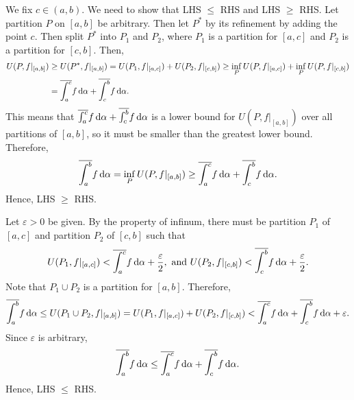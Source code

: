\documentclass[12pt]{article}
\begin{document}
\begin{fproof}[1(a)]
    We fix \(c \in (a,b)\).
    We need to show that LHS \(\leq\) RHS and LHS \(\geq\) RHS.
    Let partition \(P\) on \([a,b]\) be arbitrary.
    Then let \(P^*\) by its refinement by adding the point \(c\).
    Then split \(P^*\) into \(P_1\) and \(P_2\), where \(P_1\) is a partition for \([a,c]\) and \(P_2\) is a partition for \([c,b]\).
    Then,
    \begin{align*}
        U(P, f|_{[a,b]}) &\geq U(P^*, f|_{[a,b]}) = U(P_1, f|_{[a,c]}) + U(P_2, f|_{[c,b]}) \geq \inf_P U(P, f|_{[a,c]}) + \inf_P U(P, f|_{[c,b]})\\
        & = \overline{\int_{a}^{c}} f \mathop{}\!\mathrm{d}\alpha + \overline{\int_{c}^{b}} f\mathop{}\!\mathrm{d}\alpha.
    \end{align*}
    This means that \(\overline{\int_{a}^{c}} f \mathop{}\!\mathrm{d}\alpha + \overline{\int_{c}^{b}} f\mathop{}\!\mathrm{d}\alpha\) is a lower bound for \(U(P, f|_{[a,b]})\) over all partitions of \([a,b]\), so it must be smaller than the greatest lower bound. Therefore,
    \begin{align*}
        \overline{\int_{a}^{b}} f \mathop{}\!\mathrm{d}\alpha = \inf_{P} U(P, f|_{[a,b]}) \geq \overline{\int_{a}^{c}} f \mathop{}\!\mathrm{d}\alpha + \overline{\int_{c}^{b}} f\mathop{}\!\mathrm{d}\alpha.
    \end{align*}
    Hence, LHS \(\geq\) RHS.

    Let \(\varepsilon > 0\) be given.
    By the property of infinum, there must be partition \(P_1\) of \([a,c]\) and partition \(P_2\) of \([c,b]\) such that
    \begin{align*}
        U(P_1, f|_{[a,c]}) < \overline{\int_{a}^{c}} f \mathop{}\!\mathrm{d}\alpha + \frac{\varepsilon}{2}, \text{ and } U(P_2, f|_{[c,b]}) < \overline{\int_{c}^{b}} f \mathop{}\!\mathrm{d}\alpha + \frac{\varepsilon}{2}.
    \end{align*}
    Note that \(P_1 \cup P_2\) is a partition for \([a,b]\).
    Therefore,
    \begin{align*}
        \overline{\int_{a}^{b}} f \mathop{}\!\mathrm{d}\alpha \leq U(P_1 \cup P_2, f|_{[a,b]})  = U(P_1, f|_{[a,c]}) + U(P_2, f|_{[c,b]}) < \overline{\int_{a}^{c}} f \mathop{}\!\mathrm{d}\alpha + \overline{\int_{c}^{b}} f \mathop{}\!\mathrm{d}\alpha + \varepsilon.
    \end{align*}
    Since \(\varepsilon\) is arbitrary,
    \begin{align*}
        \overline{\int_{a}^{b}} f \mathop{}\!\mathrm{d}\alpha \leq \overline{\int_{a}^{c}} f \mathop{}\!\mathrm{d}\alpha + \overline{\int_{c}^{b}} f \mathop{}\!\mathrm{d}\alpha.
    \end{align*}
    Hence, LHS \(\leq\) RHS.
\end{fproof}
\end{document}
